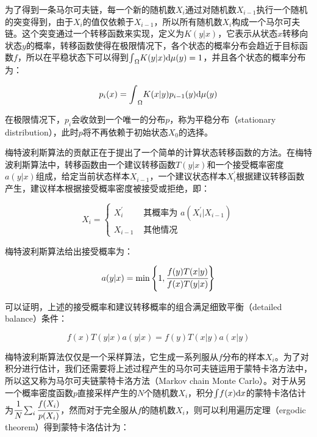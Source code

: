 为了得到一条马尔可夫链，每一个新的随机数${X}_i$通过对随机数${X}_{i-1}$执行一个随机的突变得到，由于${X}_i$的值仅依赖于${X}_{i-1}$，所以所有随机数${X}_i$构成一个马尔可夫链。这个突变通过一个转移函数来实现，定义为$K({y}|{x})$，它表示从状态${x}$转移向状态${y}$的概率，转移函数使得在极限情况下，各个状态的概率分布会趋近于目标函数$f$，所以在平稳状态下可以得到${\rm \int}_{\Omega}K({y}|{x}){\rm d}\mu ({y})=1$，并且各个状态的概率分布为：

\begin{equation}
	p_i({x})={\rm \int}_{\Omega}K({x}|{y})p_{i-1}({y}){\rm d}\mu({y})
\end{equation}

在极限情况下，$p_i$会收敛到一个唯一的分布$p$，称为平稳分布（stationary distribution），此时$p$将不再依赖于初始状态${X}_0$的选择。

梅特波利斯算法的贡献正在于提出了一个简单的计算状态转移函数的方法。在梅特波利斯算法中，转移函数由一个建议转移函数$T({y}|{x})$和一个接受概率密度$a({y}|{x})$组成，给定当前状态样本${X}_{i-1}$，一个建议状态样本${X}^{'}_i$根据建议转移函数产生，建议样本根据接受概率密度被接受或拒绝，即：

\begin{equation}
	{X}_i=\begin{cases}
		{X}^{'}_i & \text{ 其概率为 }a({X}^{'}_i|{X}_{i-1})\\
		{X}_{i-1} & \text{ 其他情况 }
	\end{cases}
\end{equation}

\noindent 梅特波利斯算法给出接受概率为：

\begin{equation}\label{e:mlt-acceptance}
	a({y}|{x})=\min \Bigg\{1, \cfrac{f({y})T({x}|{y})}{f({x})T({y}|{x})}\Bigg\}
\end{equation}

可以证明，上述的接受概率和建议转移概率的组合满足细致平衡（detailed balance）条件：

\begin{equation}
	f({x})T({y}|{x})a({y}|{x})=f({y})T({x}|{y})a({x}|{y})
\end{equation}

梅特波利斯算法仅仅是一个采样算法，它生成一系列服从$f$分布的样本${X}_i$。为了对积分进行估计，我们还需要将上述过程产生的马尔可夫链运用于蒙特卡洛方法中，所以这又称为马尔可夫链蒙特卡洛方法（Markov chain Monte Carlo）。对于从另一个概率密度函数$p$直接采样产生的$N$个随机数$X_i$，积分${\rm \int} f(x){\rm d}x$的蒙特卡洛估计为$ \cfrac{1}{N}\sum_i \cfrac{f(X_i)}{p(X_i)}$，然而对于完全服从$f$的随机数${X}_i$，则可以利用遍历定理（ergodic theorem）得到蒙特卡洛估计为：

